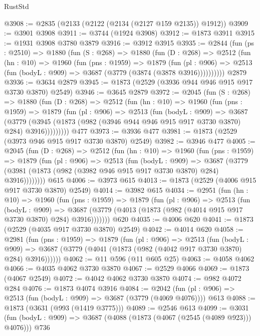 \begin{lexlean}{RustStd}
\begin{coremodule}
@3908 := @2835 (@2133 (@2122 (@2134 (@2127 @159 @2135)) @1912))
@3909 := @3901 @3908
@3911 := @3744 (@1924 @3908)
@3912 := @1873 @3911
@3915 := @1931 @3908 @3780 @3879
@3916 := @3912 @3915
@3935 := @2844
    (fun (ps : @2510) =>
    @1880
      (fun (S : @268) =>
      @1880
        (fun (D : @268) =>
        @2512
          (fun (hn : @10) =>
          @1960
            (fun (pns : @1959) =>
            @1879
              (fun (pl : @906) =>
              @2513 (fun (bodyL : @909) => @3687 (@3779 (@3874 (@3878 @3916))))))))))
    @2879
@3936 := @3634 @2879
@3945 := @1873 (@2529 (@3936 @944 @946 @915 @917 @3730 @3870) @2549)
@3946 := @3645 @2879
@3972 := @2045
    (fun (S : @268) =>
    @1880
      (fun (D : @268) =>
      @2512
        (fun (hn : @10) =>
        @1960
          (fun (pns : @1959) =>
          @1879
            (fun (pl : @906) =>
            @2513
              (fun (bodyL : @909) =>
              @3687
                (@3779
                  (@3945 (@1873 (@982 (@3946 @944 @946 @915 @917 @3730 @3870) @284) @3916)))))))))
    @477
@3973 := @3936 @477
@3981 := @1873 (@2529 (@3973 @946 @915 @917 @3730 @3870) @2549)
@3982 := @3946 @477
@4005 := @2045
    (fun (D : @268) =>
    @2512
      (fun (hn : @10) =>
      @1960
        (fun (pns : @1959) =>
        @1879
          (fun (pl : @906) =>
          @2513
            (fun (bodyL : @909) =>
            @3687 (@3779 (@3981 (@1873 (@982 (@3982 @946 @915 @917 @3730 @3870) @284) @3916))))))))
    @615
@4006 := @3973 @615
@4013 := @1873 (@2529 (@4006 @915 @917 @3730 @3870) @2549)
@4014 := @3982 @615
@4034 := @2951
    (fun (hn : @10) =>
    @1960
      (fun (pns : @1959) =>
      @1879
        (fun (pl : @906) =>
        @2513
          (fun (bodyL : @909) =>
          @3687 (@3779 (@4013 (@1873 (@982 (@4014 @915 @917 @3730 @3870) @284) @3916)))))))
    @620
@4035 := @4006 @620
@4041 := @1873 (@2529 (@4035 @917 @3730 @3870) @2549)
@4042 := @4014 @620
@4058 := @2981
    (fun (pns : @1959) =>
    @1879
      (fun (pl : @906) =>
      @2513
        (fun (bodyL : @909) =>
        @3687 (@3779 (@4041 (@1873 (@982 (@4042 @917 @3730 @3870) @284) @3916))))))
@4062 := @11 @596 (@11 @605 @25)
@4063 := @4058 @4062
@4066 := @4035 @4062 @3730 @3870
@4067 := @2529 @4066
@4069 := @1873 (@4067 @2549)
@4072 := @4042 @4062 @3730 @3870
@4074 := @982 @4072 @284
@4076 := @1873 @4074 @3916
@4084 := @2042 (fun (pl : @906) => @2513 (fun (bodyL : @909) => @3687 (@3779 (@4069 @4076)))) @613
@4088 := @1873 (@3631 (@993 (@1419 @3775)))
@4089 := @2546 @613
@4099 := @3031 (fun (bodyL : @909) => @3687 (@4088 (@1873 (@4067 (@2545 (@4089 @923))) @4076))) @736

\end{coremodule}
\end{lexlean}

